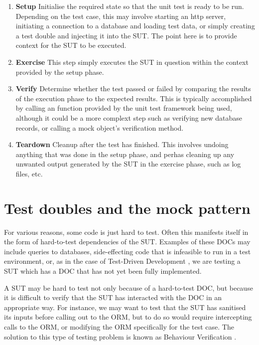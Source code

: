 \begin{enumerate}

\item \textbf{Setup} Initialise the required state so that the unit
  test is ready to be run. Depending on the test case, this may
  involve starting an http server, initiating a connection to a
  database and loading test data, or simply creating a test double and
  injecting it into the SUT. The point here is to provide context for
  the SUT to be executed.

\item \textbf{Exercise} This step simply executes the SUT in question
  within the context provided by the setup phase.

\item \textbf{Verify} Determine whether the test passed or failed by
  comparing the results of the execution phase to the expected
  results. This is typically accomplished by calling an 
  function provided by the unit test framework being used, although it
  could be a more complext step such as verifying new database
  records, or calling a mock object's verification
  method.%

\item \textbf{Teardown} Cleanup after the test has finished. This
  involves undoing anything that was done in the setup phase, and
  perhas cleaning up any unwanted output generated by the SUT in the
  exercise phase, such as log files, etc.

\end{enumerate}

\section{Test doubles and the mock pattern}

For various reasons, some code is just hard to test. Often this
manifests itself in the form of hard-to-test dependencies of the
SUT. Examples of these DOCs may include queries to databases,
side-effecting code that is infeasible to run in a test environment,
or, as in the case of Test-Driven Development \cite{beck:tdd}, we are
testing a SUT which has a DOC that has not yet been fully implemented.

A SUT may be hard to test not only because of a hard-to-test DOC, but
because it is difficult to verify that the SUT has interacted with the
DOC in an appropriate way. For instance, we may want to test that the
SUT has sanitised its inputs before calling out to the ORM, but to do
so would require intercepting calls to the ORM, or modifying the ORM
specifically for the test case. The solution to this type of testing
problem is known as Behaviour Verification \cite{meszaros:xunit}.

